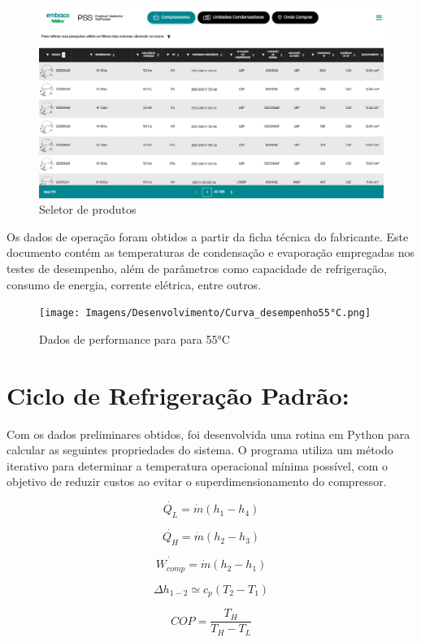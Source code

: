 \begin{figure}
    \centering
    \includegraphics[width=0.8\linewidth]{Imagens/Desenvolvimento/PSS-embraco.png}
    \caption{Seletor de produtos}
    \label{fig:seletor de produtos}
\end{figure}

\newpage

Os dados de operação foram obtidos a partir da ficha técnica do fabricante. Este documento contém as temperaturas de condensação e evaporação empregadas nos testes de desempenho, além de parâmetros como capacidade de refrigeração, consumo de energia, corrente elétrica, entre outros.

\begin{figure}[h]
    \centering
    \texttt{[image: Imagens/Desenvolvimento/Curva\_desempenho55°C.png]}
    \caption{Dados de performance para para 55°C}
    \label{fig: scurva desempenho}
\end{figure}


\section{Ciclo de Refrigeração Padrão:}

Com os dados preliminares obtidos, foi desenvolvida uma rotina em Python para calcular as seguintes propriedades do sistema. O programa utiliza um método iterativo para determinar a temperatura operacional mínima possível, com o objetivo de reduzir custos ao evitar o superdimensionamento do compressor.

\begin{equation}
    \dot{Q_L} = \dot{m}(h_1-h_4)
    \label{QL}
\end{equation}

\begin{equation}
    \dot{Q_H} = \dot{m}(h_2-h_3)
    \label{QH}
\end{equation}

\begin{equation}
    \dot{W_{comp}} = \dot{m}(h_2-h_1)
    \label{W compressor}
\end{equation}

\begin{equation}
    \Delta h_{1-2} \simeq  c_p (T_2-T_1)
    \label{simplificacao entalpia}
\end{equation}

\begin{equation}
    COP = \frac{T_H}{T_H - T_L}
    \label{COP carnot}
\end{equation}



